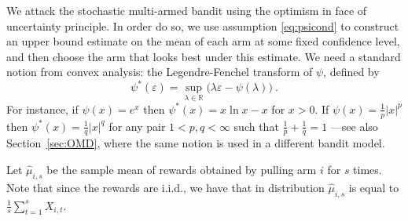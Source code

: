 \documentclass[11pt]{hackednow}
\newcommand{\R}{\mathbb{R}}
\renewcommand{\epsilon}{\varepsilon}
\newcommand{\wh}{\widehat}
\begin{document}
We attack the stochastic multi-armed bandit using the optimism in face of uncertainty principle. In order do so, we use assumption \eqref{eq:psicond} to construct an upper bound estimate on the mean of each arm at some fixed confidence level, and then choose the arm that looks best under this estimate. We need a standard notion from convex analysis: the Legendre-Fenchel transform of $\psi$, defined by
\[
    \psi^*(\epsilon) = \sup_{\lambda \in \R} \bigl(\lambda \epsilon - \psi(\lambda)\bigr)~.
\]
For instance, if $\psi(x) = e^x$ then $\psi^*(x) = x\ln x - x$ for $x > 0$. If $\psi(x) = \frac{1}{p}|x|^p$ then $\psi^*(x) = \frac{1}{q}|x|^q$ for any pair $1 < p,q < \infty$ such that $\frac{1}{p} + \frac{1}{q} = 1$ ---see also Section~\ref{sec:OMD}, where the same notion is used in a different bandit model. 

Let $\wh{\mu}_{i,s}$ be the sample mean of rewards obtained by pulling arm $i$ for $s$ times. Note that since the rewards are i.i.d., we have that in distribution $\wh{\mu}_{i,s}$ is equal to $\frac{1}{s} \sum_{t=1}^s X_{i,t}$.
\end{document}

